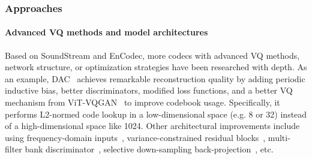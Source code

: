 \subsubsection{Approaches}



\paragraph{Advanced VQ methods and model architectures}

Based on SoundStream and EnCodec, more codecs with advanced VQ methods, network structure, or optimization strategies have been researched with depth.
As an example, DAC~\cite{kumar2024high} achieves remarkable reconstruction quality by adding periodic inductive bias, better discriminators, modified loss functions, and a better VQ mechanism from ViT-VQGAN~\cite{yu2022vectorquantized} to improve codebook usage. 
Specifically, it performs L2-normed code lookup in a low-dimensional space (e.g. 8 or 32) instead of a high-dimensional space like 1024.
Other architectural improvements include using frequency-domain inputs~\cite{APCodec,ai24b_interspeech,singlecodec}, variance-constrained residual blocks~\cite{ahn2024hilcodec}, multi-filter bank discriminator~\cite{ahn2024hilcodec}, selective down-sampling back-projection~\cite{zheng2024supercodec}, etc.

